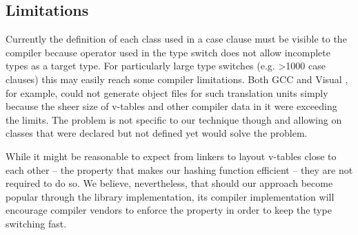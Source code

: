 
%



\subsection{Limitations}
\label{sec:lim}

Currently the definition of each class used in a case clause must be visible to 
the compiler because  operator used in the type switch does 
not allow incomplete types as a target type. For particularly large type 
switches (e.g. \textgreater 1000 case clauses) this may easily reach some 
compiler limitations. Both GCC and Visual \Cpp{}, for example, could not generate 
object files for such translation units simply because the sheer size of v-tables 
and other compiler data in it were exceeding the limits. The problem is not 
specific to our technique though and allowing  on classes 
that were declared but not defined yet would solve the problem.

While it might be reasonable to expect from linkers to layout v-tables close 
to each other -- the property that makes our hashing function efficient -- they 
are not required to do so. We believe, nevertheless, that should our approach 
become popular through the library implementation, its compiler implementation 
will encourage compiler vendors to enforce the property in order to keep the 
type switching fast.
